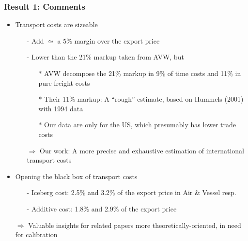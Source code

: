 \documentclass[10 pt,Helvetica, french]{beamer}
\begin{document}
 \begin{frame}
\frametitle{Result 1: Comments}
\begin{itemize}
\item Transport costs are sizeable \vspace{0.1cm}
\begin{itemize}
\item[-] Add $\simeq$ a 5\% margin over the export price \vspace{0.1cm}
\item[-] Lower than the 21\% markup taken from AVW, but  \vspace{0.1cm}
\begin{itemize}
\item[$\ast$] AVW decompose the 21\% markup in 9\% of time costs and 11\% in pure freight costs  \vspace{0.1cm}
\item[$\ast$] Their 11\% markup: A ``rough'' estimate, based on Hummels (2001) with 1994 data \vspace{0.1cm}
\item[$\ast$] Our data are only for the US, which presumably has lower trade costs \vspace{0.1cm}

\end{itemize}
\item[$\Rightarrow$] Our work: A more precise and exhaustive estimation of international transport costs \vspace{0.1cm}
\end{itemize}
\item Opening the black box of transport costs \vspace{0.1cm}
\begin{itemize}
\item[-] Iceberg cost: 2.5\% and 3.2\% of the export price in Air \& Vessel resp.
\item[-] Additive cost: 1.8\% and 2.9\% of the export price \vspace{0.1cm}
\end{itemize}
\item[$\Rightarrow$] Valuable insights for related papers more theoretically-oriented, in need for calibration
\end{itemize}
\end{frame}
\end{document}
